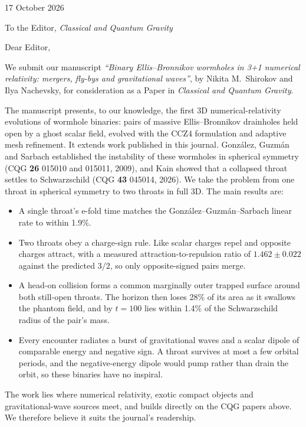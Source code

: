 \documentclass[11pt]{article}
\begin{document}
\begin{flushright}
17 October 2026
\end{flushright}

To the Editor, \emph{Classical and Quantum Gravity}

Dear Editor,

We submit our manuscript \emph{``Binary Ellis--Bronnikov wormholes in 3+1 numerical relativity: mergers, fly-bys and gravitational waves''}, by Nikita M.\ Shirokov and Ilya Nachevsky, for consideration as a Paper in \emph{Classical and Quantum Gravity}.

The manuscript presents, to our knowledge, the first 3D numerical-relativity evolutions of wormhole binaries: pairs of massive Ellis--Bronnikov drainholes held open by a ghost scalar field, evolved with the CCZ4 formulation and adaptive mesh refinement. It extends work published in this journal. Gonz\'alez, Guzm\'an and Sarbach established the instability of these wormholes in spherical symmetry (CQG \textbf{26} 015010 and 015011, 2009), and Kain showed that a collapsed throat settles to Schwarzschild (CQG \textbf{43} 045014, 2026). We take the problem from one throat in spherical symmetry to two throats in full 3D. The main results are:

\begin{itemize}\setlength{\itemsep}{0.2em}
\item A single throat's e-fold time matches the Gonz\'alez--Guzm\'an--Sarbach linear rate to within 1.9\%.
\item Two throats obey a charge-sign rule. Like scalar charges repel and opposite charges attract, with a measured attraction-to-repulsion ratio of $1.462\pm0.022$ against the predicted $3/2$, so only opposite-signed pairs merge.
\item A head-on collision forms a common marginally outer trapped surface around both still-open throats. The horizon then loses 28\% of its area as it swallows the phantom field, and by $t=100$ lies within 1.4\% of the Schwarzschild radius of the pair's mass.
\item Every encounter radiates a burst of gravitational waves and a scalar dipole of comparable energy and negative sign. A throat survives at most a few orbital periods, and the negative-energy dipole would pump rather than drain the orbit, so these binaries have no inspiral.
\end{itemize}

The work lies where numerical relativity, exotic compact objects and gravitational-wave sources meet, and builds directly on the CQG papers above. We therefore believe it suits the journal's readership.
\end{document}
